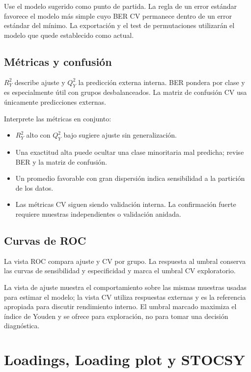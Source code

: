\documentclass[11pt,a4paper,openany]{report}
\begin{document}
Use el modelo sugerido como punto de partida. La regla de un error estándar favorece el modelo más simple cuyo BER CV permanece dentro de un error estándar del mínimo. La exportación y el test de permutaciones utilizarán el modelo que quede establecido como actual.

\section{Métricas y confusión}

$R^2_Y$ describe ajuste y $Q^2_Y$ la predicción externa interna. BER pondera por clase y es especialmente útil con grupos desbalanceados. La matriz de confusión CV usa únicamente predicciones externas.

Interprete las métricas en conjunto:

\begin{itemize}
  \item $R^2_Y$ alto con $Q^2_Y$ bajo sugiere ajuste sin generalización.
  \item Una exactitud alta puede ocultar una clase minoritaria mal predicha;
  revise BER y la matriz de confusión.
  \item Un promedio favorable con gran dispersión indica sensibilidad a la
  partición de los datos.
  \item Las métricas CV siguen siendo validación interna. La confirmación fuerte
  requiere muestras independientes o validación anidada.
\end{itemize}

\section{Curvas de ROC}

La vista ROC compara ajuste y CV por grupo. La respuesta al umbral conserva las
curvas de sensibilidad y especificidad y marca el umbral CV exploratorio.

La vista de ajuste muestra el comportamiento sobre las mismas muestras usadas
para estimar el modelo; la vista CV utiliza respuestas externas y es la
referencia apropiada para discutir rendimiento interno. El umbral marcado
maximiza el índice de Youden y se ofrece para exploración, no para tomar una
decisión diagnóstica.

\chapter{Loadings, Loading plot y STOCSY}
\end{document}
